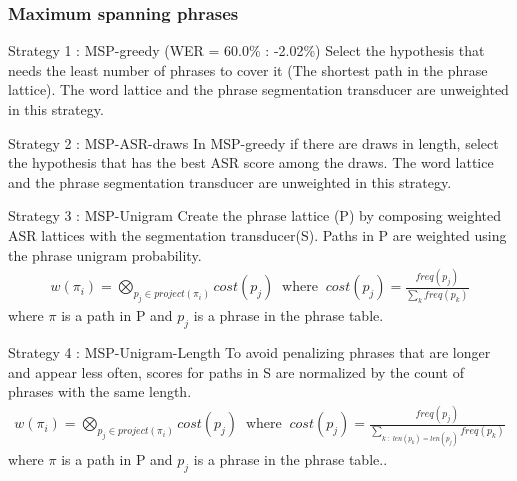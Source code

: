 \documentclass{beamer}
\begin{document}
\begin{frame}
\frametitle{Maximum spanning phrases}
\begin{block}{Strategy 1 : MSP-greedy (WER = 60.0\% : -2.02\%)}
Select the hypothesis that needs the least number of phrases to cover it (The shortest path in the phrase lattice). 
The word lattice and the phrase segmentation transducer are unweighted in this strategy.
\end{block}

\begin{block}{Strategy 2 : MSP-ASR-draws}
In MSP-greedy if there are draws in length, select the hypothesis that has the best ASR score among the draws. 
The word lattice and the phrase segmentation transducer are unweighted in this strategy.
\end{block}
\end{frame}

\begin{frame}
\begin{block}{Strategy 3 : MSP-Unigram}
Create the phrase lattice (P) by composing weighted ASR lattices with the segmentation transducer(S). Paths in P are weighted 
using the phrase unigram probability.
\begin{align*}
w(\pi_i) = \bigotimes_{p_j \in project(\pi_i)} cost(p_j) \;\; \text{where} \;\; cost(p_j) = \frac{freq(p_j)}{\sum \limits_{k} freq(p_k)}
\end{align*}
where $\pi$ is a path in P and $p_j$ is a phrase in the phrase table.
\end{block}

\begin{block}{Strategy 4 : MSP-Unigram-Length}
To avoid penalizing phrases that are longer and appear less often, scores for paths in S are normalized by the count of phrases with the same length.
\begin{align*}
w(\pi_i) = \bigotimes_{p_j \in project(\pi_i)} cost(p_j) \;\; \text{where} \;\; cost(p_j) = \frac{freq(p_j)}{\sum \limits_{k \; : \; len(p_k) = len(p_j)}freq(p_k)}
\end{align*}
where $\pi$ is a path in P and $p_j$ is a phrase in the phrase table..
\end{block}
\end{frame}

\end{document}
